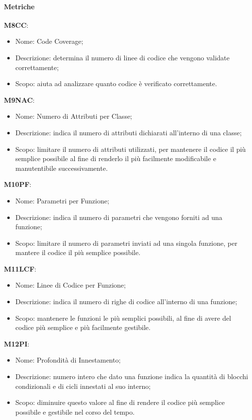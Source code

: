     \paragraph{Metriche}\hfill \break
    \textbf{M8CC}:
    \begin{itemize}
      \item Nome: Code Coverage;
      \item Descrizione: determina il numero di linee di codice che vengono validate correttamente;
      \item Scopo: aiuta ad analizzare quanto codice è verificato correttamente.
    \end{itemize}
    \textbf{M9NAC}:
    \begin{itemize}
      \item Nome: Numero di Attributi per Classe;
      \item Descrizione: indica il numero di attributi dichiarati all'interno di una classe;
      \item Scopo: limitare il numero di attributi utilizzati, per mantenere il codice il più semplice possibile al fine di renderlo il più facilmente modificabile e manutentibile successivamente.
    \end{itemize} 
    \textbf{M10PF}:
    \begin{itemize}
      \item Nome: Parametri per Funzione;
      \item Descrizione: indica il numero di parametri che vengono forniti ad una funzione;
      \item Scopo: limitare il numero di parametri inviati ad una singola funzione, per mantere il codice il più semplice possibile.
    \end{itemize}
    \textbf{M11LCF}:
    \begin{itemize}
      \item Nome: Linee di Codice per Funzione;
      \item Descrizione: indica il numero di righe di codice all'interno di una funzione;
      \item Scopo: mantenere le funzioni le più semplici possibili, al fine di avere del codice più semplice e più facilmente gestibile.
    \end{itemize}    
    \textbf{M12PI}:
    \begin{itemize}
      \item Nome: Profondità di Innestamento;
      \item Descrizione: numero intero che dato una funzione indica la quantità di blocchi condizionali e di cicli innestati al suo interno;
      \item Scopo: diminuire questo valore al fine di rendere il codice più semplice possibile e gestibile nel corso del tempo.
    \end{itemize}
